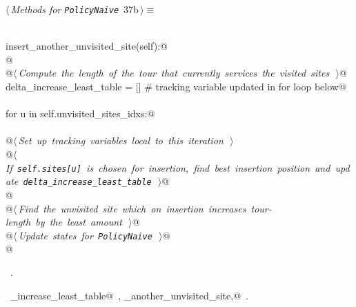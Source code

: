 \documentclass[11.5pt]{report}
\begin{document}
\newchunk 
\begin{flushleft} \small\label{scrap33}\raggedright\small
{} $\langle\,${\itshape Methods for \verb|PolicyNaive|}\nobreak\ {\footnotesize {37b}}$\,\rangle\equiv$
\vspace{-1ex}
\begin{list}{}{} \item
\mbox{}\verb@@\\
\mbox{}\verb@def insert_another_unvisited_site(self):@\\
\mbox{}\verb@ @\\
\mbox{}\verb@     @\hbox{$\langle\,${\itshape Compute the length of the tour that currently services the visited sites}\nobreak\ {\footnotesize {}}$\,\rangle$}\verb@    @\\
\mbox{}\verb@     delta_increase_least_table = [] # tracking variable updated in for loop below@\\
\mbox{}\verb@@\\
\mbox{}\verb@     for u in self.unvisited_sites_idxs:@\\
\mbox{}\verb@@\\
\mbox{}\verb@         @\hbox{$\langle\,${\itshape Set up tracking variables local to this iteration}\nobreak\ {\footnotesize {}}$\,\rangle$}\verb@@\\
\mbox{}\verb@         @\hbox{$\langle\,${\itshape If \texttt{self.sites[u]} is chosen for insertion, find best insertion position and update \texttt{delta\_increase\_least\_table}}\nobreak\ {\footnotesize {}}$\,\rangle$}\verb@  @\\
\mbox{}\verb@                 @\\
\mbox{}\verb@     @\hbox{$\langle\,${\itshape Find the unvisited site which on insertion increases tour-length by the least amount}\nobreak\ {\footnotesize {}}$\,\rangle$}\verb@     @\\
\mbox{}\verb@     @\hbox{$\langle\,${\itshape Update states for \texttt{PolicyNaive}}\nobreak\ {\footnotesize {}}$\,\rangle$}\verb@ @\\
\mbox{}\verb@ @\\
\mbox{}\verb@@{\NWsep}
\end{list}
\vspace{-1.5ex}
\footnotesize
\begin{list}{}{\setlength{\itemsep}{-\parsep}\setlength{\itemindent}{-\leftmargin}}
\item \NWtxtMacroRefIn\ .
\item \NWtxtIdentsDefed\nobreak\  \verb@delta_increase_least_table@\nobreak\ , \verb@insert_another_unvisited_site,@\nobreak\ \NWtxtIdentsNotUsed.
\item{}
\end{list}
\vspace{4ex}
\end{flushleft}
\newchunk 
\end{document}
